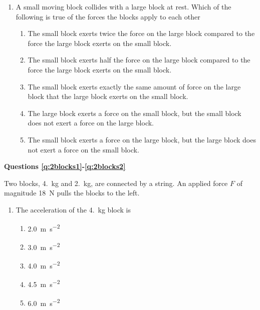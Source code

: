 \documentclass{../../../oss-apphys}
\begin{document}
\genheader


\genmultidirections

\gengravity

\raggedcolumns
\begin{multicols}{2}
  \begin{enumerate}[leftmargin=18pt]
  \item A small moving block collides with a large block at rest. Which of the
    following is true of the forces the blocks apply to each other
    \begin{enumerate}[noitemsep,topsep=0pt,leftmargin=18pt,label=(\Alph*)]
    \item The small block exerts twice the force on the large block
      compared to the force the large block exerts on the small block.
    \item The small block exerts half the force on the large block compared
      to the force the large block exerts on the small block.
    \item The small block exerts exactly the same amount of force on the
      large block that the large block exerts on the small block.
    \item The large block exerts a force on the small block, but the small
      block does not exert a force on the large block.
    \item The small block exerts a force on the large block, but the large
      block does not exert a force on the small block.
    \end{enumerate}
    
  \end{enumerate}
  
  \textbf{Questions \ref{q:2blocks1}-\ref{q:2blocks2}}

  Two blocks, \SI{4.}{\kilo\gram} and \SI{2.}{\kilo\gram}, are connected by a
  string. An applied force $F$ of magnitude \SI{18}{\newton} pulls the blocks
  to the left.
  
  \begin{enumerate}[resume,leftmargin=18pt]
    
  \item The acceleration of the \SI{4.}{\kilo\gram} block is
    \begin{enumerate}[nosep,leftmargin=18pt,label=(\Alph*)]
    \item\SI{2.0}{\metre\per\second\squared}
    \item\SI{3.0}{\metre\per\second\squared}
    \item\SI{4.0}{\metre\per\second\squared}
    \item\SI{4.5}{\metre\per\second\squared}
    \item\SI{6.0}{\metre\per\second\squared}
    \end{enumerate}
    \label{q:2blocks1}
    

\end{enumerate}
\end{multicols}
\end{document}
